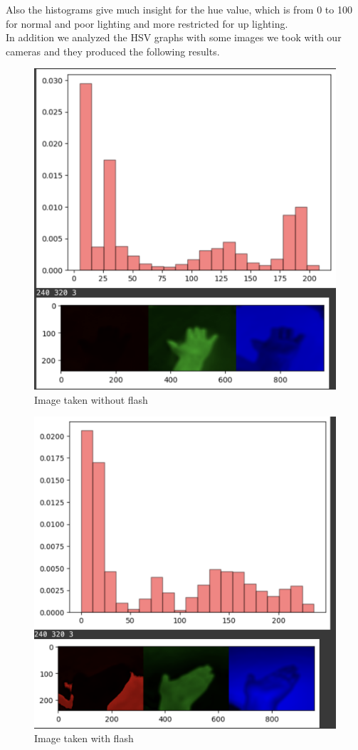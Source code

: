 \documentclass{report}
\begin{document}
Also the histograms give much insight for the hue value, which is from 0 to 100 for normal and
poor lighting and more restricted for up lighting. \\
In addition we analyzed the HSV graphs with some images we took with our cameras and they produced the following results.
\begin{figure}[H]
\includegraphics[scale=0.4]{Images/HSVNormal_J.png}
 \caption{Image taken without flash}
\centering
\end{figure}
\begin{figure}[H]
\includegraphics[scale=0.4]{Images/HSVUp_J.png}
  \caption{Image taken with flash}
\centering
\end{figure}
\end{document}
